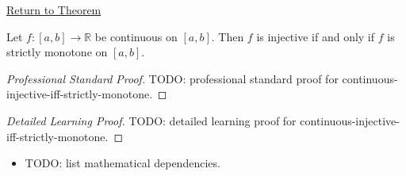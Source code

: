 \newpage
{}
\label{prf:continuous-injective-iff-strictly-monotone}

\begin{remark*}[Return]
\hyperref[prop:continuous-injective-iff-strictly-monotone]{Return to Theorem}
\end{remark*}

\begin{theorem*}
Let $f:[a,b]\to\mathbb{R}$ be continuous on $[a,b]$. Then $f$ is injective if and only if $f$ is strictly monotone on $[a,b]$.
\end{theorem*}

\begin{proof}[Professional Standard Proof]
\LRAProofBodyStart
TODO: professional standard proof for continuous-injective-iff-strictly-monotone.
\end{proof}

\begin{proof}[Detailed Learning Proof]
\LRAProofBodyStart
TODO: detailed learning proof for continuous-injective-iff-strictly-monotone.
\end{proof}

\begin{remark*}
\end{remark*}

\begin{dependencies}
\begin{itemize}
  \item TODO: list mathematical dependencies.
\end{itemize}
\end{dependencies}

\clearpage
